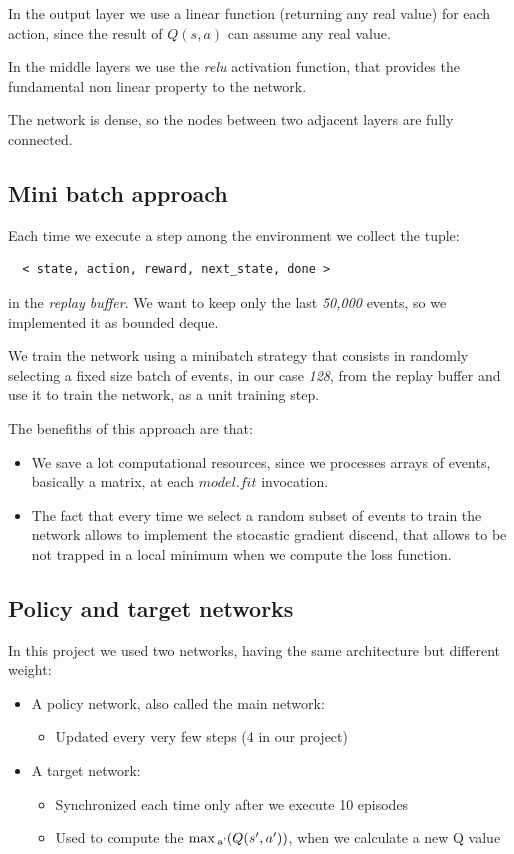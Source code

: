 \documentclass{article}
\begin{document}
In the output layer we use a linear function (returning any real value) for each action,
since the result of $Q(s,a)$ can assume any real value.

In the middle layers we use the \emph{relu} activation function, that provides the fundamental 
non linear property to the network.

The network is dense, so the nodes between two adjacent layers are fully connected.

\subsection{Mini batch approach}

Each time we execute a step among the environment we collect the tuple:

\begin{verbatim}
  < state, action, reward, next_state, done >
\end{verbatim}

in the \emph{replay buffer}.
We want to keep only the last \emph{50,000} events, so we implemented it as bounded deque.

We train the network using a minibatch strategy that consists
in randomly selecting a fixed size batch of events,
in our case \emph{128}, from the replay buffer and use it to train the network,
as a unit training step.

The benefiths of this approach are that:

\begin{itemize}
  \item We save a lot computational resources, 
  since we processes arrays of events, basically a matrix, at each $model.fit$ invocation.
  \item The fact that every time we select a random subset of events 
  to train the network allows to implement the stocastic gradient discend, that allows
  to be not trapped in a local minimum when we compute the loss function.
\end{itemize}

\subsection{Policy and target networks}

In this project we used two networks, having the same architecture but different weight:

\begin{itemize}
  \item A policy network, also called the main network:
  \begin{itemize}
    \item{Updated every very few steps (4 in our project)}
  \end{itemize}   
  \item A target network:
  \begin{itemize}
    \item{Synchronized each time only after we execute 10 episodes}
    \item{Used to compute the $\max\textsubscript{a'} (Q(s',a'))$, when we calculate a new Q value}
  \end{itemize} 
\end{itemize}
\end{document}
